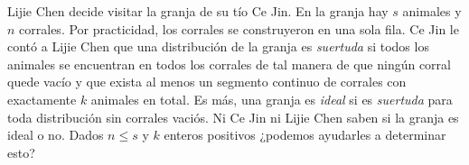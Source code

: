 \begin{statement}{27}
  Lijie Chen decide visitar la granja de su t\'io Ce Jin.
  En la granja hay $s$ animales y $n$ corrales.
  Por practicidad, los corrales se construyeron en una sola fila.
  Ce Jin le cont\'o a Lijie Chen que una distribuci\'on de la granja es \textit{suertuda} si
  todos los animales se encuentran en todos los corrales de tal manera de que ning\'un corral quede vac\'io
  y que exista al menos un segmento continuo de corrales con exactamente $k$ animales en total.
  Es m\'as, una granja es \textit{ideal} si es \textit{suertuda} para toda distribuci\'on
  sin corrales vaci\'os.
  Ni Ce Jin ni Lijie Chen saben si la granja es ideal o no.
  Dados $n \leq s$ y $k$ enteros positivos ¿podemos ayudarles a determinar esto?
\end{statement}